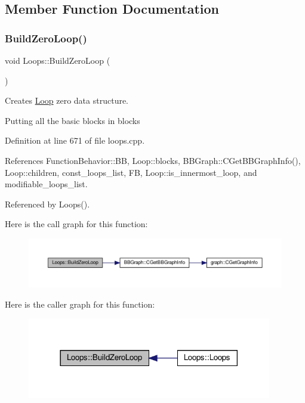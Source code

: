 \subsection{Member Function Documentation}
\mbox{\label{classLoops_ab35bfb9d05e559e6295037325ad22a1d}} 
\subsubsection{\texorpdfstring{Build\+Zero\+Loop()}{BuildZeroLoop()}}
{\footnotesize\ttfamily void Loops\+::\+Build\+Zero\+Loop (\begin{DoxyParamCaption}{ }\end{DoxyParamCaption})\hspace{0.3cm}{\ttfamily [private]}}



Creates \hyperlink{classLoop}{Loop} zero data structure. 

Putting all the basic blocks in blocks 

Definition at line 671 of file loops.\+cpp.



References Function\+Behavior\+::\+BB, Loop\+::blocks, B\+B\+Graph\+::\+C\+Get\+B\+B\+Graph\+Info(), Loop\+::children, const\+\_\+loops\+\_\+list, FB, Loop\+::is\+\_\+innermost\+\_\+loop, and modifiable\+\_\+loops\+\_\+list.



Referenced by Loops().

Here is the call graph for this function\+:
\nopagebreak
\begin{figure}[H]
\begin{center}
\leavevmode
\includegraphics[width=350pt]{d3/ded/classLoops_ab35bfb9d05e559e6295037325ad22a1d_cgraph}
\end{center}
\end{figure}
Here is the caller graph for this function\+:
\nopagebreak
\begin{figure}[H]
\begin{center}
\leavevmode
\includegraphics[width=302pt]{d3/ded/classLoops_ab35bfb9d05e559e6295037325ad22a1d_icgraph}
\end{center}
\end{figure}
\mbox{\label{classLoops_a55b90509f95276dd9cc5ca5cbfeb01b1}} 

